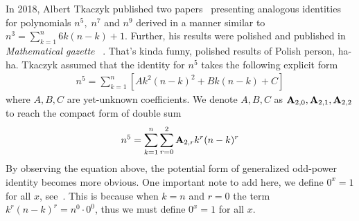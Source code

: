 In 2018, Albert Tkaczyk published two papers~\cite{tkaczyk2018problem, tkaczyk2018continuation}
presenting analogous identities for polynomials $n^5, \; n^7$ and $n^9$
derived in a manner similar to $n^3 = \sum_{k=1}^{n} 6k(n-k) + 1$.
Further, his results were polished and published in \textit{Mathematical gazette}
~\cite{unusual_identity_for_odd_powers}.
That's kinda funny, polished results of Polish person, ha-ha.
Tkaczyk assumed that the identity for $n^5$ takes the following explicit form
\begin{align*}
    n^5 = \sum_{k=1}^{n} \left[ A k^2(n-k)^2 + Bk(n-k) + C \right]
\end{align*}
where $A,B,C$ are yet-unknown coefficients.
We denote $A,B,C$ as ${\mathbf{A}} \sb{2,0}, {\mathbf{A}} \sb{2,1}, {\mathbf{A}} \sb{2,2}$
to reach the compact form of double sum
\begin{align*}
    n^5 = \sum_{k=1}^{n} \sum_{r=0}^{2} {\mathbf{A}} \sb{2,r} k^r (n-k)^r
\end{align*}
By observing the equation above, the potential form of generalized odd-power identity becomes more obvious.
One important note to add here, we define $0^x = 1$ for all $x$, see~\cite[~p. 162]{graham1994concrete}.
This is because when $k=n$ and $r=0$ the term $k^r (n-k)^r = n^0 \cdot 0^0$, thus we must define $0^x = 1$
for all $x$.

